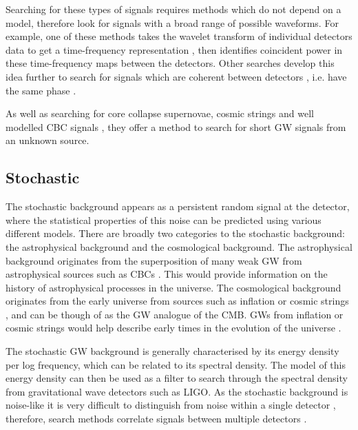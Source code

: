 Searching for these types of signals requires methods which do not depend on a model, therefore look for signals with a broad range of possible waveforms.
For example, one of these methods takes the wavelet transform of individual detectors data to get a time-frequency representation \citep{klimenko2004PerformanceWaveBurst}, then identifies coincident power in these time-frequency maps between the detectors. 
Other searches develop this idea further to search for signals which are coherent between detectors \citep{cornish2015BayeswaveBayesian, klimenko2008CoherentMethod}, i.e. have the same phase .

As well as searching for core collapse supernovae, cosmic strings and well modelled \gls{CBC} signals \citep{aasi2014SearchGravitational}, they offer a method to search for short \gls{GW} signals from an unknown source. 


\subsection{Stochastic}

The stochastic background appears as a persistent random signal at the detector, where the statistical properties of this noise can be predicted using various different models.   
There are broadly two categories to the stochastic background: the astrophysical background and the cosmological background. 
The astrophysical background originates from the superposition of many weak \gls{GW} from astrophysical sources such as \glspl{CBC} \citep{regimbau2011AstrophysicalGravitational}. 
This would provide information on the history of astrophysical processes in the universe.
The cosmological background originates from the early universe from sources such as inflation or cosmic strings \citep{maggiore2000GravitationalWave}, and can be though of as the \gls{GW} analogue of the \gls{CMB}.
\glspl{GW} from inflation or cosmic strings would help describe early times in the evolution of the universe \citep{christensen2018StochasticGravitational}.

The stochastic \gls{GW} background is generally characterised by its energy density per log frequency, which can be related to its spectral density. 
The model of this energy density can then be used as a filter to search through the spectral density from gravitational wave detectors such as \gls{LIGO}.
As the stochastic background is noise-like it is very difficult to distinguish from noise within a single detector \citep{christensen2018StochasticGravitational}, therefore, search methods correlate signals between multiple detectors
\citep{romano2019SearchesStochastic,christensen2018StochasticGravitational}.


